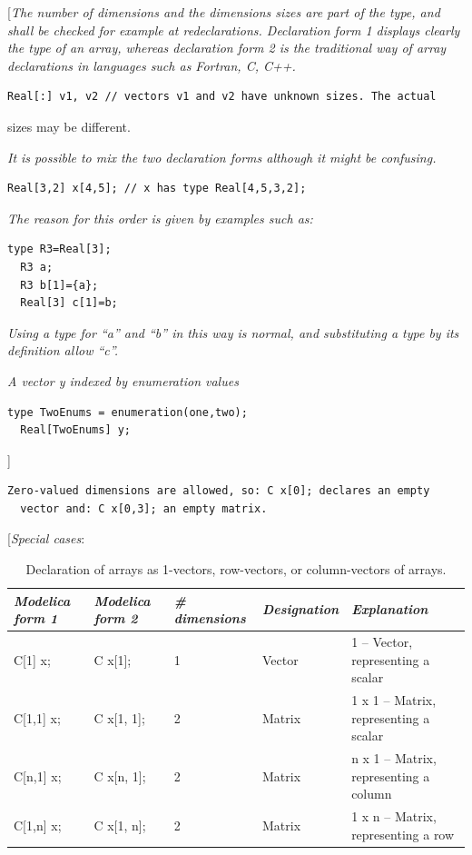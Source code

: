 \documentclass[10pt,a4paper]{report}
\begin{document}
{[}\emph{The number of dimensions and the dimensions sizes are part of
the type, and shall be checked for example at redeclarations.
Declaration form 1 displays clearly the type of an array, whereas
declaration form 2 is the traditional way of array declarations in
languages such as Fortran, C, C++.}

\begin{lstlisting}[language=modelica]
  Real[:] v1, v2 // vectors v1 and v2 have unknown sizes. The actual
\end{lstlisting}
sizes may be different.

\emph{It is possible to mix the two declaration forms although it might
be confusing.}

\begin{lstlisting}[language=modelica]
  Real[3,2] x[4,5]; // x has type Real[4,5,3,2];
\end{lstlisting}
\emph{The reason for this order is given by examples such as:}

\begin{lstlisting}[language=modelica]
  type R3=Real[3];
  R3 a;
  R3 b[1]={a};
  Real[3] c[1]=b;
\end{lstlisting}
\emph{Using a type for ``a'' and ``b'' in this way is normal, and
substituting a type by its definition allow ``c''.}

\emph{A vector y indexed by enumeration values}

\begin{lstlisting}[language=modelica]
  type TwoEnums = enumeration(one,two);
  Real[TwoEnums] y;
\end{lstlisting}
{]}

\begin{lstlisting}[language=modelica]
  Zero-valued dimensions are allowed, so: C x[0]; declares an empty
  vector and: C x[0,3]; an empty matrix.
\end{lstlisting}
{[}\emph{Special cases}:

\begin{longtable}{|l|l|l|l|p{3cm}|}
\caption{Declaration of arrays as 1-vectors, row-vectors, or
column-vectors of arrays.}\\
\hline
\emph{Modelica form 1} & \emph{Modelica form 2} & \emph{\# dimensions} &
\emph{Designation} & \emph{Explanation}\\ \hline
\endhead
C{[}1{]} x; & C x{[}1{]};  & 1 & Vector & 1 -- Vector, representing a scalar\\ \hline
C{[}1,1{]} x; & C x{[}1, 1{]}; & 2 & Matrix & 1 x 1 -- Matrix, representing a scalar\\ \hline
C{[}n,1{]} x; & C x{[}n, 1{]}; & 2 & Matrix & n x 1 -- Matrix, representing a column\\ \hline
C{[}1,n{]} x; & C x{[}1, n{]}; & 2 & Matrix & 1 x n -- Matrix, representing a row\\ \hline
\end{longtable}
\end{document}

